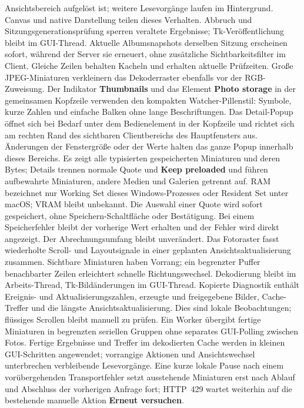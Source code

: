 \documentclass[11pt,a4paper]{article}
\newcommand{\ui}[1]{\textbf{#1}}
\begin{document}
Ansichtsbereich aufgelöst ist; weitere Lesevorgänge laufen im Hintergrund.
Canvas und native Darstellung teilen dieses Verhalten. Abbruch und
Sitzungsgenerationsprüfung sperren veraltete Ergebnisse; Tk-Veröffentlichung
bleibt im GUI-Thread.
Aktuelle Albumsnapshots derselben Sitzung erscheinen sofort, während der Server
sie erneuert, ohne zusätzliche Sichtbarkeitsfilter im Client. Gleiche Zeilen
behalten Kacheln und erhalten aktuelle Prüfzeiten. Große JPEG-Miniaturen
verkleinern das Dekoderraster ebenfalls vor der RGB-Zuweisung.
Der Indikator \ui{Thumbnails} und das Element \ui{Photo storage} in der
gemeinsamen Kopfzeile verwenden den kompakten Watcher-Pillenstil: Symbole, kurze
Zahlen und einfache Balken ohne lange Beschriftungen. Das Detail-Popup öffnet
sich bei Bedarf unter dem Bedienelement in der Kopfzeile und richtet sich am
rechten Rand des sichtbaren Clientbereichs des Hauptfensters aus. Änderungen
der Fenstergröße oder der Werte halten das ganze Popup innerhalb dieses Bereichs.
Es zeigt alle typisierten gespeicherten
Miniaturen und deren Bytes; Details trennen normale Quote und \ui{Keep preloaded}
und führen aufbewahrte Miniaturen, andere Medien und Galerien getrennt auf. RAM
bezeichnet nur Working Set dieses Windows-Prozesses oder Resident Set unter
macOS; VRAM bleibt unbekannt. Die Auswahl einer Quote wird sofort gespeichert,
ohne Speichern-Schaltfläche oder Bestätigung. Bei einem Speicherfehler bleibt
der vorherige Wert erhalten und der Fehler wird direkt angezeigt. Der
Abrechnungsumfang bleibt unverändert.
Das Fotoraster fasst wiederholte Scroll- und Layoutsignale in einer geplanten
Ansichtsaktualisierung zusammen. Sichtbare Miniaturen haben Vorrang; ein
begrenzter Puffer benachbarter Zeilen erleichtert schnelle Richtungswechsel.
Dekodierung bleibt im Arbeits-Thread, Tk-Bildänderungen im GUI-Thread.
Kopierte Diagnostik enthält Ereignis- und Aktualisierungszahlen, erzeugte und
freigegebene Bilder, Cache-Treffer und die längste Ansichtsaktualisierung.
Dies sind lokale Beobachtungen; flüssiges Scrollen bleibt manuell zu prüfen.
Ein Worker übergibt fertige Miniaturen in begrenzten seriellen Gruppen ohne
separates GUI-Polling zwischen Fotos. Fertige Ergebnisse und Treffer im
dekodierten Cache werden in kleinen GUI-Schritten angewendet; vorrangige
Aktionen und Ansichtswechsel unterbrechen verbleibende Lesevorgänge.
Eine kurze lokale Pause nach einem vorübergehenden Transportfehler setzt
ausstehende Miniaturen erst nach Ablauf und Abschluss der vorherigen Anfrage
fort; HTTP~429 wartet weiterhin auf die bestehende manuelle Aktion
\ui{Erneut versuchen}.
\end{document}
